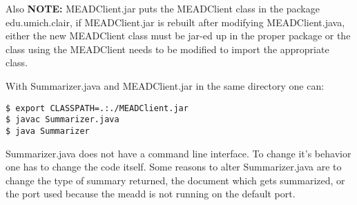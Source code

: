 \documentclass[10pt]{article}
\begin{document}
Also {\bf NOTE:} MEADClient.jar puts the MEADClient class in the
package edu.umich.clair, if MEADClient.jar is rebuilt after
modifying MEADClient.java, either the new MEADClient class must
be jar-ed up in the proper package or the class using the MEADClient
needs to be modified to import the appropriate class.

With Summarizer.java and MEADClient.jar in the same directory one can:
\begin{verbatim}
$ export CLASSPATH=.:./MEADClient.jar
$ javac Summarizer.java
$ java Summarizer
\end{verbatim}

Summarizer.java does not have a command line interface.  To
change it's behavior one has to change the code itself.  Some
reasons to alter Summarizer.java are to change the type of
summary returned, the document which gets summarized, or the
port used because the meadd is not running on the default port.
\end{document}
